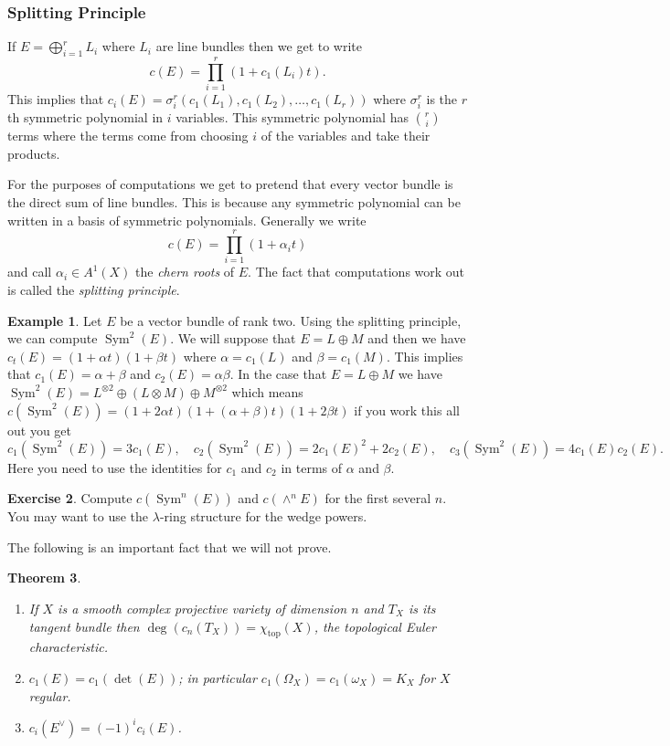 \documentclass[12pt]{article}
\numberwithin{equation}{section}
\newtheorem{theorem}{Theorem}[subsection]
\theoremstyle{definition}
\newtheorem{example}[theorem]{Example}
\newtheorem{exercise}[theorem]{Exercise}
\theoremstyle{remark}
\newcommand{\Sym}{\operatorname{Sym}}
\renewcommand{\top}{\operatorname{top}}
\renewcommand{\top}{\operatorname{top}}
\begin{document}
\subsubsection{Splitting Principle}
If $E = \bigoplus_{i=1}^r L_i$ where $L_i$ are line bundles then we get to write 
$$ c(E) = \prod_{i=1}^r(1+c_1(L_i)t).$$
This implies that $c_i(E) = \sigma^{r}_i( c_1(L_1), c_1(L_2),\ldots, c_1(L_r) )$ where $\sigma^r_i$ is the $r$th symmetric polynomial in $i$ variables.
This symmetric polynomial has ${r \choose i}$ terms where the terms come from choosing $i$ of the variables and take their products.

For the purposes of computations we get to pretend that every vector bundle is the direct sum of line bundles.
This is because any symmetric polynomial can be written in a basis of symmetric polynomials. 
Generally we write
$$c(E) = \prod_{i=1}^r ( 1+ \alpha_i t )$$
and call $\alpha_i \in A^1(X)$ the \emph{chern roots} of $E$.
The fact that computations work out is called the \emph{splitting principle}. 

\begin{example}
	Let $E$ be a vector bundle of rank two. Using the splitting principle, we can compute $\Sym^2(E)$.
	We will suppose that $E = L\oplus M$ and then we have $c_t(E) = (1+\alpha t)(1+\beta t)$ where $\alpha=c_1(L)$ and $\beta=c_1(M)$. 
	This implies that $c_1(E) = \alpha+\beta$ and $c_2(E) =\alpha\beta$. 
	In the case that $E=L\oplus M$ we have $\Sym^2(E) = L^{\otimes 2}\oplus (L\otimes M) \oplus M^{\otimes 2}$ which means $c(\Sym^2(E)) = (1+2\alpha t)(1+(\alpha+\beta) t)(1+2\beta t)$ if you work this all out you get 
	$$ c_1(\Sym^2(E)) = 3c_1(E), \quad c_2 (\Sym^2(E)) = 2c_1(E)^2+2c_2(E), \quad c_3(\Sym^2(E)) = 4c_1(E)c_2(E).$$
	Here you need to use the identities for $c_1$ and $c_2$ in terms of $\alpha$ and $\beta$.
\end{example}

\begin{exercise}
	Compute $c(\Sym^n(E))$ and $c(\wedge^nE)$ for the first several $n$. 
	You may want to use the $\lambda$-ring structure for the wedge powers.
\end{exercise}



The following is an important fact that we will not prove. 
\begin{theorem}
	\begin{enumerate}
	\item If $X$ is a smooth complex projective variety of dimension $n$ and $T_X$ is its tangent bundle then $\deg(c_n(T_X)) = \chi_{\top}(X)$, the topological Euler characteristic. 
	\item $c_1(E) = c_1(\det(E))$; in particular $c_1(\Omega_X) = c_1(\omega_X)=K_X$ for $X$ regular.
	\item $c_i(E^{\vee}) = (-1)^i c_i(E)$. 
	\end{enumerate}
\end{theorem}
\end{document}
